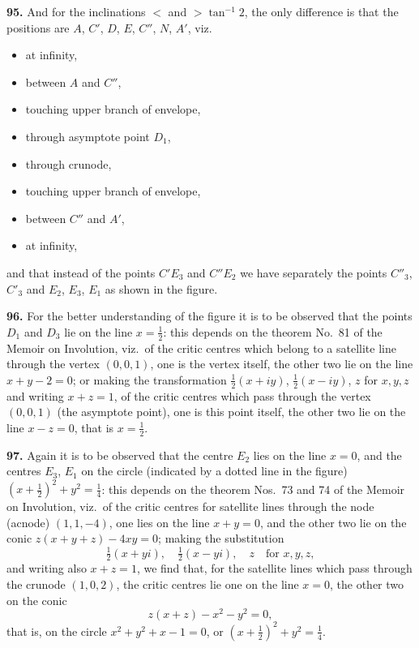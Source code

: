 \documentclass[11pt,a4paper]{article}
\theoremstyle{plain}
\begin{document}
\noindent\textbf{95.} And for the inclinations $<$ and $> \tan^{-1}2$, the only difference is that the positions are $A$, $C'$, $D$, $E$, $C''$, $N$, $A'$, viz.
\begin{itemize}[nosep]
\item[$A$,] at infinity,
\item[$M$,] between $A$ and $C''$,
\item[$C'$,] touching upper branch of envelope,
\item[$D$,] through asymptote point $D_1$,
\item[$E$,] through crunode,
\item[$C''$,] touching upper branch of envelope,
\item[$N$,] between $C''$ and $A'$,
\item[$A'$,] at infinity,
\end{itemize}
and that instead of the points $C'E_3$ and $C''E_2$ we have separately the points $C''_3$, $C'_3$ and $E_2$, $E_3$, $E_1$ as shown in the figure.

\noindent\textbf{96.} For the better understanding of the figure it is to be observed that the points $D_1$ and $D_3$ lie on the line $x = \tfrac{1}{2}$: this depends on the theorem No.~81 of the Memoir on Involution, viz.\ of the critic centres which belong to a satellite line through the vertex $(0, 0, 1)$, one is the vertex itself, the other two lie on the line $x + y - 2 = 0$; or making the transformation $\tfrac{1}{2}(x+iy)$, $\tfrac{1}{2}(x-iy)$, $z$ for $x, y, z$ and writing $x + z = 1$, of the critic centres which pass through the vertex $(0, 0, 1)$ (the asymptote point), one is this point itself, the other two lie on the line $x - z = 0$, that is $x = \tfrac{1}{2}$.

\noindent\textbf{97.} Again it is to be observed that the centre $E_2$ lies on the line $x = 0$, and the centres $E_3$, $E_1$ on the circle (indicated by a dotted line in the figure) $(x + \tfrac{1}{2})^2 + y^2 = \tfrac{1}{4}$: this depends on the theorem Nos.~73 and 74 of the Memoir on Involution, viz.\ of the critic centres for satellite lines through the node (acnode) $(1, 1, -4)$, one lies on the line $x + y = 0$, and the other two lie on the conic $z(x+y+z) - 4xy = 0$; making the substitution
\[
\tfrac{1}{2}(x+yi), \quad \tfrac{1}{2}(x-yi), \quad z \quad \text{for } x, y, z,
\]
and writing also $x + z = 1$, we find that, for the satellite lines which pass through the crunode $(1, 0, 2)$, the critic centres lie one on the line $x = 0$, the other two on the conic
\[
z(x+z) - x^2 - y^2 = 0,
\]
that is, on the circle $x^2 + y^2 + x - 1 = 0$, or $(x + \tfrac{1}{2})^2 + y^2 = \tfrac{1}{4}$.
\end{document}
